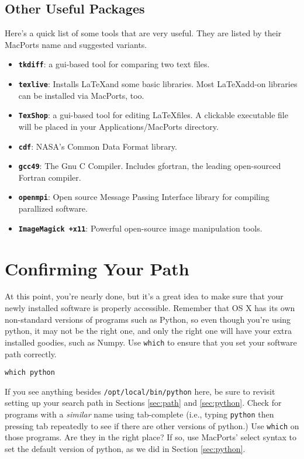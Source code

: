 \documentclass[12pt, letterpaper]{article}
\begin{document}
\subsection{Other Useful Packages}
Here's a quick list of some tools that are very useful.  They are listed by
their MacPorts name and suggested variants.
\begin{itemize}
  \item \textbf{\tt tkdiff}: a gui-based tool for comparing two text files.
  \item \textbf{\tt texlive}: Installs \LaTeX and some basic libraries.
    Most \LaTeX add-on libraries can be installed via MacPorts, too.
  \item \textbf{\tt TexShop}: a gui-based tool for editing \LaTeX files.  A
    clickable executable file will be placed in your Applications/MacPorts
    directory.
  \item \textbf{\tt cdf}: NASA's Common Data Format library.
  \item \textbf{\tt gcc49}: The Gnu C Compiler.  Includes gfortran, the leading
    open-sourced Fortran compiler.
  \item \textbf{\tt openmpi}: Open source Message Passing Interface library for
    compiling parallized software.
  \item \textbf{\tt ImageMagick +x11}: Powerful open-source image manipulation
    tools.
\end{itemize}

\section{Confirming Your Path}
At this point, you're nearly done, but it's a great idea to make sure that
your newly installed software is properly accessible. Remember that OS X has
its own non-standard versions of programs such as Python, so even though you're
using python, it may not be the right one, and only the right one will have
your extra installed goodies, such as Numpy.  Use {\tt which} to
ensure that you set your software path correctly.
\begin{verbatim}
which python
\end{verbatim}
If you see anything besides {\tt /opt/local/bin/python} here, be sure to
revisit setting up your search path in Sections \ref{sec:path} and
\ref{sec:python}.   Check for programs with a \emph{similar} name using
tab-complete (i.e., typing {\tt python} then pressing tab repeatedly to see
if there are other versions of python.)  Use {\tt which} on those programs.
Are they in the right place?  If so, use MacPorts' select syntax to set the
default version of python, as we did in Section \ref{sec:python}.
\end{document}
